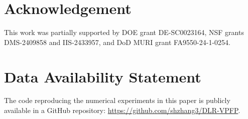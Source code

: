 \documentclass[]{article}
\numberwithin{equation}{section}
\begin{document}
\section*{Acknowledgement}
This work was partially supported by DOE grant DE-SC0023164, NSF grants DMS-2409858 and IIS-2433957, and DoD MURI grant FA9550-24-1-0254.

\section*{Data Availability Statement}
The code reproducing the numerical experiments in this paper is publicly available in a GitHub repository: \url{https://github.com/shzhang3/DLR-VPFP}.


% 

\end{document}
